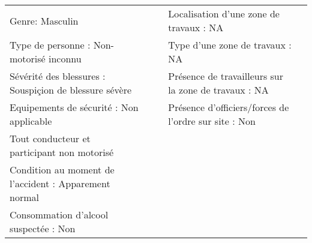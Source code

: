 \documentclass[a4paper,12pt,twoside,french]{book}
[a4paper,12pt,twoside]
\begin{document}
\begin{landscape}
\begin{table}[]
\begin{adjustbox}{width=2.1\textwidth,center=\textwidth}
\begin{tabular}{|l|l|l|l|l|}
Genre: Masculin                                                                                                      &                                                             &                                                                                     & Localisation d'une zone de travaux : NA                                            &  \\
Type de personne : Non-motorisé inconnu                                                                              &                                                             &                                                                                     & Type d'une zone de travaux : NA                                                    &  \\
Sévérité des blessures : Souspiçion de   blessure sévère                                                             &                                                             &                                                                                     & Présence de travailleurs sur la zone de travaux : NA                               &  \\
Equipements de sécurité : Non applicable                                                                             &                                                             &                                                                                     & Présence d'officiers/forces de l'ordre sur site : Non                              &  \\
{\color[HTML]{196B24} Tout conducteur et participant   non motorisé}                                                 &                                                             &                                                                                     &                                                                                    &  \\
Condition au moment de l'accident :   Apparement normal                                                              &                                                             &                                                                                     &                                                                                    &  \\
Consommation d'alcool suspectée : Non                                                                                &                                                             &                                                                                     &                                                                                    &  \\

\end{tabular}
\end{adjustbox}
\end{table}
\end{landscape}
\end{document}
